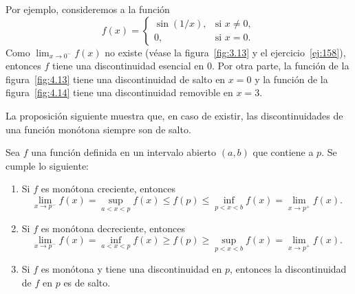 \documentclass[12pt,a4paper]{book}
\begin{document}
    Por ejemplo, consideremos a la función
    \begin{equation*}
        f(x)=\begin{cases}
            \sin(1/x), & \text{si }x\neq 0,\\
            0, & \text{si }x=0.
        \end{cases}
    \end{equation*}
    Como $\lim_{x\to 0^{-}}f(x)$ no existe (véase la figura~\ref{fig:3.13} y el ejercicio~\ref{ej:158}), entonces
    $f$ tiene una discontinuidad esencial en $0$. Por otra parte, la función de la figura~\ref{fig:4.13}
    tiene una discontinuidad de salto en $x=0$ y la función de la figura~\ref{fig:4.14}
    tiene una discontinuidad removible en $x=3$.

    La proposición siguiente muestra que, en caso de existir, las discontinuidades
    de una función monótona siempre son de salto.

    \begin{proposicion}\label{prop:58}
        Sea
        $f$ una función definida en un intervalo abierto $(a,b)$ que contiene a $p$. Se
        cumple lo siguiente:
        \begin{enumerate}
            \item Si $f$ es monótona creciente, entonces
            \begin{equation}\label{eq:4.48}
                \lim_{x\to p^{-}}f(x)=\sup_{a<x<p}f(x)\leq f(p)\leq\inf_{p<x<b}f(x)=\lim_{x\to p^{+}}f(x).
            \end{equation}
            \item Si $f$ es monótona decreciente, entonces
            \begin{equation}\label{eq:4.49}
                \lim_{x\to p^{-}}f(x)=\inf_{a<x<p}f(x)\geq f(p)\geq\sup_{p<x<b}f(x)=\lim_{x\to p^{+}}f(x).
            \end{equation}
            \item Si $f$ es monótona y tiene una discontinuidad en $p$, entonces la discontinuidad
            de $f$ en $p$ es de salto.
        \end{enumerate}
    \end{proposicion}
\end{document}
